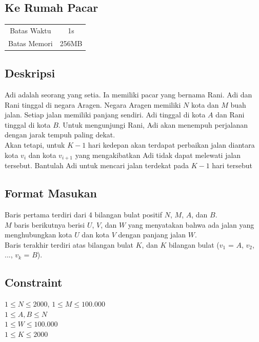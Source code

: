 \documentclass{article}
\begin{document}
\begin{center}

    
    \section*{Ke Rumah Pacar} %

    \begin{tabular}{ | c c | }
        \hline
        Batas Waktu  & 1s \\    %
        Batas Memori & 256MB \\  %
        \hline
    \end{tabular}
\end{center}

\subsection*{Deskripsi}
Adi adalah seorang yang setia. Ia memiliki pacar yang bernama Rani. Adi dan Rani tinggal di negara Aragen. Negara Aragen memiliki $N$ kota dan $M$ buah jalan. Setiap jalan memiliki panjang sendiri. Adi tinggal di kota $A$ dan Rani tinggal di kota $B$. Untuk mengunjungi Rani, Adi akan menempuh perjalanan dengan jarak tempuh paling dekat. \\

Akan tetapi, untuk $K - 1$ hari kedepan akan terdapat perbaikan jalan diantara kota $v_i$ dan kota $v_{i+1}$ yang mengakibatkan Adi tidak dapat melewati jalan tersebut. Bantulah Adi untuk mencari jalan terdekat pada $K - 1$ hari tersebut

\subsection*{Format Masukan}

Baris pertama terdiri dari 4 bilangan bulat positif $N$, $M$, $A$, dan $B$.\\
$M$ baris berikutnya berisi $U$, $V$, dan $W$ yang menyatakan bahwa ada jalan yang menghubungkan kota $U$ dan kota $V$ dengan panjang jalan $W$.\\
Baris terakhir terdiri atas bilangan bulat $K$, dan $K$ bilangan bulat ($v_1$ = $A$, $v_2$, ..., $v_k$ = $B$). 


\subsection*{Constraint}
$1 \leq N \leq 2000$, $1 \leq M \leq 100.000$\\
$1 \leq A, B \leq N$\\
$1 \leq W \leq 100.000$\\
$1 \leq K \leq 2000$
\end{document}
